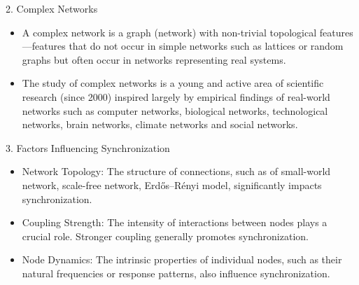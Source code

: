 \documentclass[
  notheorems,
  aspectratio=54,
]{beamer}
\begin{document}
\begin{frame}{2. Complex Networks}
  \begin{itemize}
    \item A complex network is a graph (network) with non-trivial topological features—features that do not occur in simple networks such as lattices or random graphs but often occur in networks representing real systems.
    \item  The study of complex networks is a young and active area of scientific research (since 2000) inspired largely by empirical findings of real-world networks such as computer networks, biological networks, technological networks, brain networks, climate networks and social networks.
  \end{itemize}
\end{frame}

\begin{frame}{3. Factors Influencing Synchronization}
  \begin{itemize}
    \item Network Topology: The structure of connections, such as of small-world network, scale-free network, Erdős–Rényi model, significantly impacts synchronization.
    \item Coupling Strength: The intensity of interactions between nodes plays a crucial role. Stronger coupling generally promotes synchronization.
    \item Node Dynamics: The intrinsic properties of individual nodes, such as their natural frequencies or response patterns, also influence synchronization.
  \end{itemize}
\end{frame}
\end{document}
